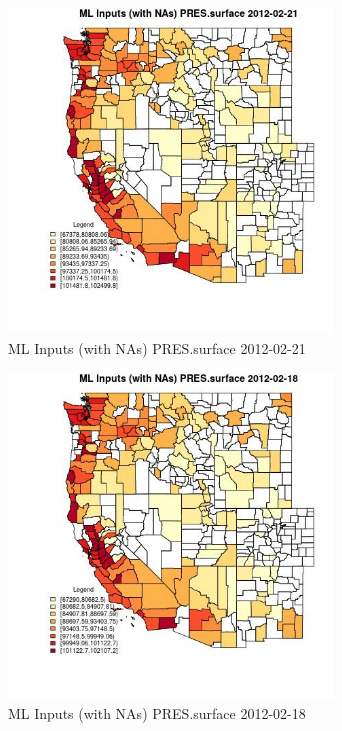 \begin{figure} 
\centering  
\includegraphics[width=0.77\textwidth]{Code_Outputs/Report_ML_input_PM25_Step4_part_f_de_duplicated_aveswNAs_CountyPRESsurfaceMean2012-02-21.jpg} 
\caption{\label{fig:Report_ML_input_PM25_Step4_part_f_de_duplicated_aveswNAsCountyPRESsurfaceMean2012-02-21}ML Inputs (with NAs) PRES.surface 2012-02-21} 
\end{figure} 
 

\begin{figure} 
\centering  
\includegraphics[width=0.77\textwidth]{Code_Outputs/Report_ML_input_PM25_Step4_part_f_de_duplicated_aveswNAs_CountyPRESsurfaceMean2012-02-18.jpg} 
\caption{\label{fig:Report_ML_input_PM25_Step4_part_f_de_duplicated_aveswNAsCountyPRESsurfaceMean2012-02-18}ML Inputs (with NAs) PRES.surface 2012-02-18} 
\end{figure} 
 

